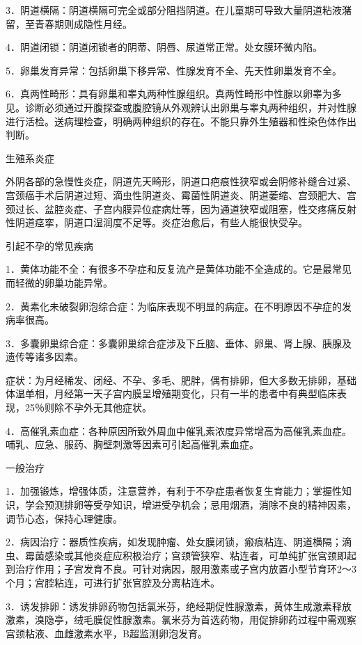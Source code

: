 \documentclass[12pt,UTF8]{ctexbook}
\begin{document}
3．阴道横隔：阴道横隔可完全或部分阻挡阴道。在儿童期可导致大量阴道粘液潴留，至青春期则成隐性月经。

4．阴道闭锁：阴道闭锁者的阴蒂、阴唇、尿道常正常。处女膜环微内陷。

5．卵巢发育异常：包括卵巢下移异常、性腺发育不全、先天性卵巢发育不全。

6．真两性畸形：具有卵巢和睾丸两种性腺组织。真两性畸形中性腺以卵睾为多见。诊断必须通过开腹探查或腹腔镜从外观辨认出卵巢与睾丸两种组织，并对性腺进行活检。送病理检查，明确两种组织的存在。不能只靠外生殖器和性染色体作出判断。

生殖系炎症

外阴各部的急慢性炎症，阴道先天畸形，阴道口疤痕性狭窄或会阴修补缝合过紧、宫颈癌手术后阴道过短、滴虫性阴道炎、霉菌性阴道炎、阴道萎缩、宫颈肥大、宫颈过长、盆腔炎症、子宫内膜异位症病灶等，因为通道狭窄或阻塞，性交疼痛反射性阴道痉挛，阴道口湿润度不足等。炎症治愈后，有些人能很快受孕。

引起不孕的常见疾病

1．黄体功能不全：有很多不孕症和反复流产是黄体功能不全造成的。它是最常见而轻微的卵巢功能异常。

2．黄素化未破裂卵泡综合症：为临床表现不明显的病症。在不明原因不孕症的发病率很高。

3．多囊卵巢综合症：多囊卵巢综合症涉及下丘脑、垂体、卵巢、肾上腺、胰腺及遗传等诸多因素。

症状：为月经稀发、闭经、不孕、多毛、肥胖，偶有排卵，但大多数无排卵，基础体温单相，月经第一天子宫内膜呈增殖期变化，只有一半的患者中有典型临床表现，25％则除不孕外无其他症状。

4．高催乳素血症：各种原因所致外周血中催乳素浓度异常增高为高催乳素血症。哺乳、应急、服药、胸壁刺激等因素可引起高催乳素血症。

一般治疗

1．加强锻炼，增强体质，注意营养，有利于不孕症患者恢复生育能力；掌握性知识，学会预测排卵等受孕知识，增进受孕机会；忌用烟酒，消除不良的精神因素，调节心态，保持心理健康。

2．病因治疗：器质性疾病，如发现肿瘤、处女膜闭锁，瘢痕粘连、阴道横隔；滴虫、霉菌感染或其他炎症应积极治疗；宫颈管狭窄、粘连者，可单纯扩张宫颈即起到治疗作用；子宫发育不良。可针对病因，服用激素或子宫内放置小型节育环2～3个月；宫腔粘连，可进行扩张官腔及分离粘连术。

3．诱发排卵：诱发排卵药物包括氯米芬，绝经期促性腺激素，黄体生成激素释放激素，溴隐亭，绒毛膜促性腺激素。氯米芬为首选药物，用促排卵药过程中需观察宫颈粘液、血雌激素水平，B超监测卵泡发育。
\end{document}
